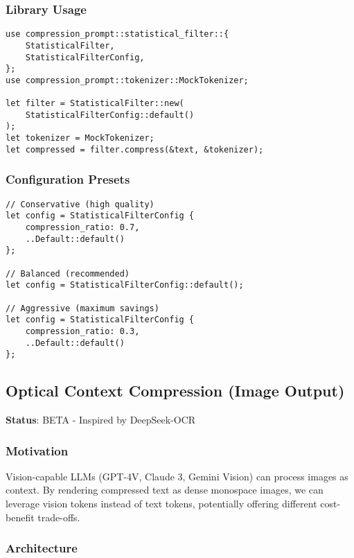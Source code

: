 \subsubsection{Library Usage}

\begin{verbatim}
use compression_prompt::statistical_filter::{
    StatisticalFilter,
    StatisticalFilterConfig,
};
use compression_prompt::tokenizer::MockTokenizer;

let filter = StatisticalFilter::new(
    StatisticalFilterConfig::default()
);
let tokenizer = MockTokenizer;
let compressed = filter.compress(&text, &tokenizer);
\end{verbatim}

\subsubsection{Configuration Presets}

\begin{verbatim}
// Conservative (high quality)
let config = StatisticalFilterConfig {
    compression_ratio: 0.7,
    ..Default::default()
};

// Balanced (recommended)
let config = StatisticalFilterConfig::default();

// Aggressive (maximum savings)
let config = StatisticalFilterConfig {
    compression_ratio: 0.3,
    ..Default::default()
};
\end{verbatim}

\subsection{Optical Context Compression (Image Output)}

\textbf{Status}: BETA - Inspired by DeepSeek-OCR~\cite{deepseek2024ocr}

\subsubsection{Motivation}

Vision-capable LLMs (GPT-4V, Claude 3, Gemini Vision) can process images as context. By rendering compressed text as dense monospace images, we can leverage vision tokens instead of text tokens, potentially offering different cost-benefit trade-offs.

\subsubsection{Architecture}

